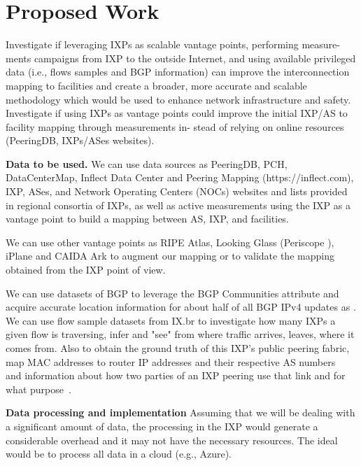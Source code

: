 \chapter{Proposed Work}\label{cap:proposal}
\thispagestyle{empty}

	Investigate if leveraging IXPs as scalable vantage points, performing measure- ments campaigns from IXP to the outside Internet, and using available privileged data (i.e., flows samples and BGP information) can improve the interconnection mapping to facilities and create a broader, more accurate and scalable methodology which would be used to enhance network infrastructure and safety. Investigate if using IXPs as vantage points could improve the initial IXP/AS to facility mapping through measurements in- stead of relying on online resources (PeeringDB, IXPs/ASes websites).

	\textbf{Data to be used.} We can use data sources as PeeringDB, PCH, DataCenterMap, Inflect Data Center and Peering Mapping (https://inflect.com), IXP, ASes, and Network Operating Centers (NOCs) websites and lists provided in regional consortia of IXPs, as well as active measurements using the IXP as a vantage point to build a mapping between AS, IXP, and facilities. 

	We can use other vantage points as RIPE Atlas, Looking Glass (Periscope \cite{Periscope}), iPlane and CAIDA Ark to augment our mapping or to validate the mapping obtained from the IXP point of view.

	We can use datasets of BGP to leverage the BGP Communities attribute and acquire accurate location information for about half of all BGP IPv4 updates as \cite{Giotsas:2017:DPI:3098822.3098855}. We can use flow sample datasets from IX.br to investigate how many IXPs a given flow is traversing, infer and "see" from where traffic arrives, leaves, where it comes from. Also to obtain the ground truth of this IXP’s public peering fabric, map MAC addresses to router IP addresses and their respective AS numbers~\cite{Ager:2012} and information about how two parties of an IXP peering use that link and for what purpose~\cite{Richter:2014}.


	\textbf{Data processing and implementation} Assuming that we will be dealing with a significant amount of data, the processing in the IXP would generate a considerable overhead and it may not have the necessary resources. The ideal would be to process all data in a cloud (e.g., Azure).

